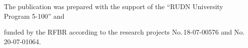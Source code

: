 























\Ack


\noindent


The publication was prepared with the support of the ``RUDN University Program 5-100'' and 


funded by the RFBR according to the research projects No.\,18-07-00576 and No.\,20-07-01064. 


 





\vspace*{-12pt}





\renewcommand{\bibname}{\protect\rmfamily References}







